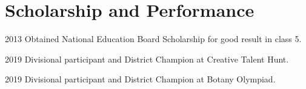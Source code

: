 \documentclass[a4paper]{article}
\begin{document}




\section{Scholarship and Performance}

\begin{CV}
\item[2013] Obtained National Education Board Scholarship for good result in class 5.
\item[2019] Divisional participant and District Champion at Creative Talent Hunt.
\item[2019] Divisional participant and District Champion at Botany Olympiad.
\end{CV}

\end{document}
